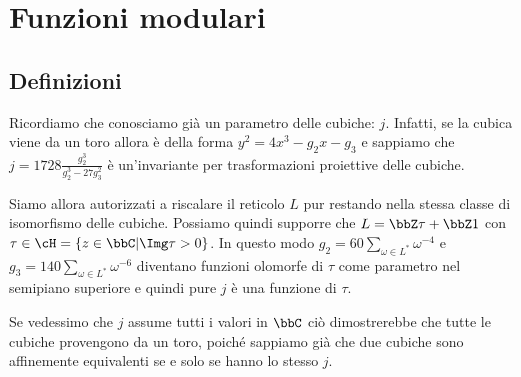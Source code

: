 \chapter{Funzioni modulari}

\section{Definizioni}


\begin{osservazione}
  Ricordiamo che conosciamo già un parametro delle cubiche:
  $j$. Infatti, se la cubica viene da un toro allora è della forma
  $y^2 = 4 x^3 - g_2 x - g_3$ e sappiamo che
  $j = 1728 \frac{g_2^3}{g_2^3 - 27 g_3^2}$ è un'invariante per
  trasformazioni proiettive delle cubiche.
\end{osservazione}

Siamo allora autorizzati a riscalare il reticolo $L$ pur restando nella
stessa classe di isomorfismo delle cubiche. Possiamo quindi supporre che
$L = \bbZ \tau + \bbZ 1$ con $\tau \in \cH = \{ z \in \bbC | \Img \tau >
0 \}$. In questo modo $g_2 = 60 \sum_{\omega \in L^*} \omega^{-4}$ e
$g_3 = 140 \sum_{\omega \in L^*} \omega^{-6}$ diventano funzioni
olomorfe di $\tau$ come parametro nel semipiano superiore e quindi pure
$j$ è una funzione di $\tau$.

\begin{osservazione} \label{170123-j_suriettiva}
  Se vedessimo che $j$ assume tutti i valori in $\bbC$ ciò dimostrerebbe
  che tutte le cubiche provengono da un toro, poiché sappiamo già che
  due cubiche sono affinemente equivalenti se e solo se hanno lo stesso $j$.
\end{osservazione}

